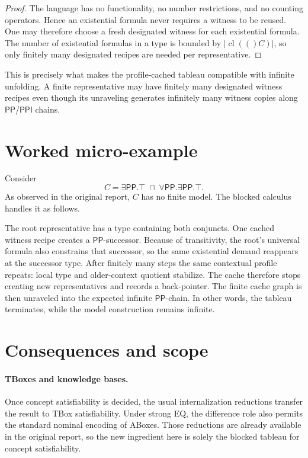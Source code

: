 \documentclass[11pt]{article}
\theoremstyle{definition}
\newcommand{\PP}{\mathsf{PP}}
\newcommand{\PPI}{\mathsf{PPI}}
\newcommand{\cl}[1]{\operatorname{cl}(#1)}
\begin{document}
\begin{proof}
The language has no functionality, no number restrictions, and no counting operators. Hence an existential formula never requires a witness to be reused. One may therefore choose a fresh designated witness for each existential formula. The number of existential formulas in a type is bounded by $|\cl(C)|$, so only finitely many designated recipes are needed per representative.
\end{proof}

This is precisely what makes the profile-cached tableau compatible with infinite unfolding. A finite representative may have finitely many designated witness recipes even though its unraveling generates infinitely many witness copies along $\PP$/$\PPI$ chains.

\section{Worked micro-example}

Consider
\[
C = \exists \PP.\top \;\sqcap\; \forall \PP.\exists \PP.\top.
\]
As observed in the original report, $C$ has no finite model. The blocked calculus handles it as follows.

The root representative has a type containing both conjuncts. One cached witness recipe creates a $\PP$-successor. Because of transitivity, the root's universal formula also constrains that successor, so the same existential demand reappears at the successor type. After finitely many steps the same contextual profile repeats: local type and older-context quotient stabilize. The cache therefore stops creating new representatives and records a back-pointer. The finite cache graph is then unraveled into the expected infinite $\PP$-chain. In other words, the tableau terminates, while the model construction remains infinite.

\section{Consequences and scope}

\paragraph{TBoxes and knowledge bases.}
Once concept satisfiability is decided, the usual internalization reductions transfer the result to TBox satisfiability. Under strong EQ, the difference role also permits the standard nominal encoding of ABoxes. Those reductions are already available in the original report, so the new ingredient here is solely the blocked tableau for concept satisfiability.
\end{document}
